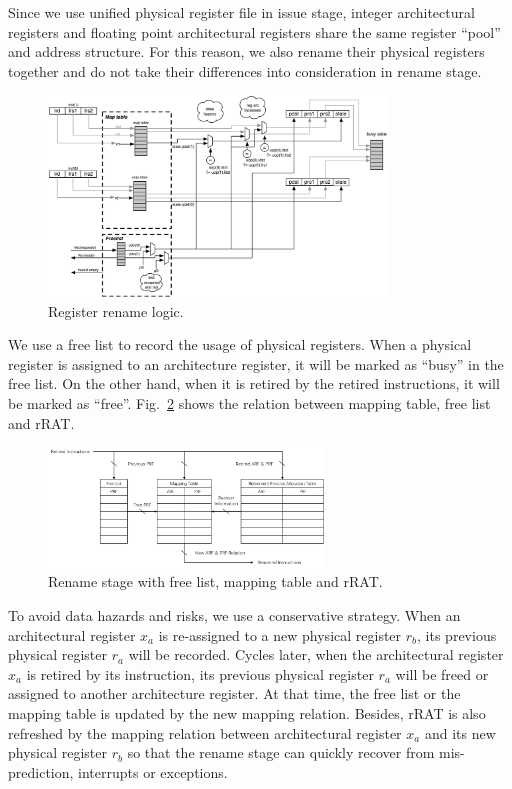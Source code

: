 Since we use unified physical register file in issue stage, integer architectural registers and floating point architectural registers share the same register ``pool'' and address structure. For this reason, we also rename their physical registers together and do not take their differences into consideration in rename stage.

\begin{figure}[!htp]
    \centering
    \includegraphics[width=0.8\textwidth]{figure/rename-pipeline.png}
    \caption{Register rename logic\cite{Boom}.}
    \label{fig:rename}
\end{figure}

We use a free list to record the usage of physical registers. When a physical register is assigned to an architecture register, it will be marked as ``busy'' in the free list. On the other hand, when it is retired by the retired instructions, it will be marked as ``free''. Fig.~\ref{fig:mapping} shows the relation between mapping table, free list and rRAT.

\begin{figure}[!htp]
    \centering
    \includegraphics[width=0.65\textwidth]{figure/map_rename.png}
    \caption{Rename stage with free list, mapping table and rRAT.}
    \label{fig:mapping}
\end{figure}

To avoid data hazards and risks, we use a conservative strategy. When an architectural register $x_a$ is re-assigned to a new physical register $r_b$, its previous physical register $r_a$ will be recorded. Cycles later, when the architectural register $x_a$ is retired by its instruction, its previous physical register $r_a$ will be freed or assigned to another architecture register. At that time, the free list or the mapping table is updated by the new mapping relation. Besides, rRAT is also refreshed by the mapping relation between architectural register $x_a$ and its new physical register $r_b$ so that the rename stage can quickly recover from mis-prediction, interrupts or exceptions.

